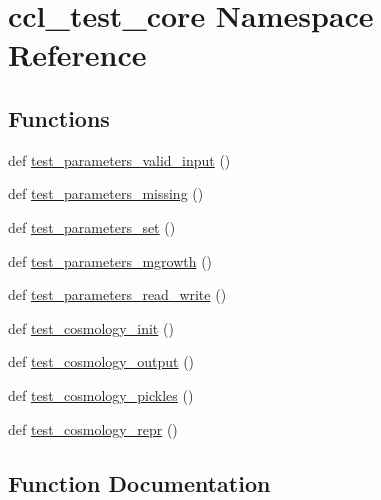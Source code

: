 \hypertarget{namespaceccl__test__core}{}\section{ccl\+\_\+test\+\_\+core Namespace Reference}
\label{namespaceccl__test__core}
\subsection*{Functions}
\begin{DoxyCompactItemize}
\item 
def \mbox{\hyperlink{namespaceccl__test__core_a5d78733a80588dd665203627d89b0b6f}{test\+\_\+parameters\+\_\+valid\+\_\+input}} ()
\item 
def \mbox{\hyperlink{namespaceccl__test__core_a0e549d6d40a6192560d27eeee5a52c6a}{test\+\_\+parameters\+\_\+missing}} ()
\item 
def \mbox{\hyperlink{namespaceccl__test__core_a6d316a5e78c5a180dfc4b6887fa0b9f8}{test\+\_\+parameters\+\_\+set}} ()
\item 
def \mbox{\hyperlink{namespaceccl__test__core_a1cf68bb2178c995528cfa1a7f1c14832}{test\+\_\+parameters\+\_\+mgrowth}} ()
\item 
def \mbox{\hyperlink{namespaceccl__test__core_a924e671fa5314cb9250c4e9205105870}{test\+\_\+parameters\+\_\+read\+\_\+write}} ()
\item 
def \mbox{\hyperlink{namespaceccl__test__core_a4d2642cc4efaf3e38a2ba27fecc98abd}{test\+\_\+cosmology\+\_\+init}} ()
\item 
def \mbox{\hyperlink{namespaceccl__test__core_a7086ffc367c4c602cd12e67b76209a44}{test\+\_\+cosmology\+\_\+output}} ()
\item 
def \mbox{\hyperlink{namespaceccl__test__core_a6eb4932e1d1d3b5ba670e92cb7380254}{test\+\_\+cosmology\+\_\+pickles}} ()
\item 
def \mbox{\hyperlink{namespaceccl__test__core_a378920c66829abd38df0532cdbc13f22}{test\+\_\+cosmology\+\_\+repr}} ()
\end{DoxyCompactItemize}


\subsection{Function Documentation}
\mbox{\label{namespaceccl__test__core_a4d2642cc4efaf3e38a2ba27fecc98abd}} 
